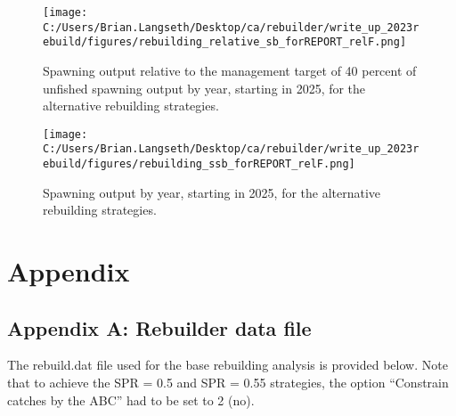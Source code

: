 \documentclass[11pt,
  letterpaper,
]{article}
\begin{document}
\begin{figure}
{\centering
\texttt{[image: C:/Users/Brian.Langseth/Desktop/ca/rebuilder/write\_up\_2023rebuild/figures/rebuilding\_relative\_sb\_forREPORT\_relF.png]}
}
\caption{Spawning output relative to the management target of 40 percent of unfished spawning output by year, starting in 2025, for the alternative rebuilding strategies.\label{fig:rel-ssb-fig}}
\end{figure}

\begin{figure}
{\centering
\texttt{[image: C:/Users/Brian.Langseth/Desktop/ca/rebuilder/write\_up\_2023rebuild/figures/rebuilding\_ssb\_forREPORT\_relF.png]}
}
\caption{Spawning output by year, starting in 2025, for the alternative rebuilding strategies.\label{fig:ssb-fig}}
\end{figure}

\clearpage

\clearpage

\hypertarget{appendix}{%
\section{Appendix}\label{appendix}}

\hypertarget{append_a}{%
\subsection{Appendix A: Rebuilder data file}\label{append_a}}

The rebuild.dat file used for the base rebuilding analysis is provided below. Note that to achieve the SPR = 0.5 and SPR = 0.55 strategies, the option ``Constrain catches by the ABC'' had to be set to 2 (no).

\clearpage
\end{document}

